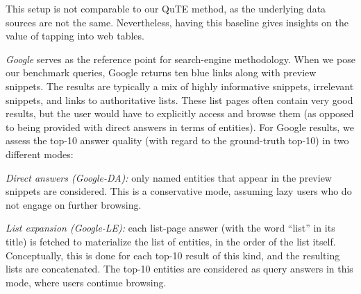 This setup is not comparable to our QuTE method, as the underlying data sources
are  not the same. Nevertheless, having this baseline gives insights on the value of tapping 
into web tables.
%
\item \textit{Google} serves as the reference point for search-engine methodology.
When we pose our benchmark queries, Google returns ten blue links along with preview snippets.
The results are typically a mix of highly informative snippets, irrelevant snippets,
and links to authoritative lists. These list pages often contain very good results,
but the user would have to explicitly access and browse them (as opposed to being
provided with direct answers in terms of entities).
\squishend
%
For Google results, 
we assess the top-10 answer quality (with regard to the ground-truth top-10)
in two different modes: 
\squishlist
\item \textit{Direct answers (Google-DA):} 
only named entities that appear in the preview snippets are 
considered. This is a conservative mode, assuming lazy users who do not engage on
further browsing.
\item \textit{List expansion (Google-LE):}
each list-page answer (with the word ``list'' in its title)
is fetched to materialize the list of entities, in the order of the list itself.
Conceptually, this is done for each top-10 result of this kind, and the resulting lists
are concatenated. 
The top-10 entities are considered as query answers in this mode, where users continue browsing.
\squishend




